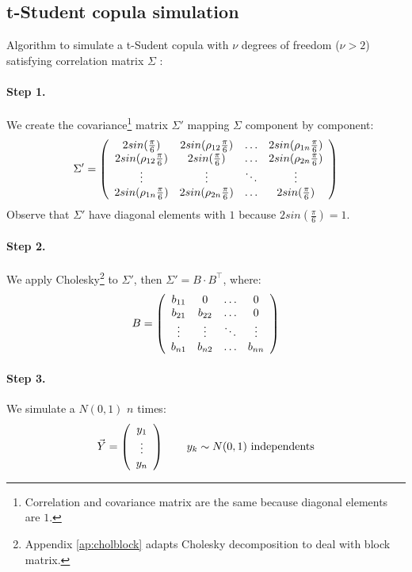 \documentclass[a4paper,12pt,final]{article}
\begin{document}
\subsection{t-Student copula simulation}
\label{ap:tstudentcopu}
Algorithm to simulate a t-Sudent copula with $\nu$ degrees of freedom ($\nu > 2$) 
satisfying correlation matrix $\Sigma$ \cite{copu:pricing}:

\paragraph{Step 1.} We create the covariance\footnote{Correlation and covariance 
matrix are the same because diagonal elements are $1$.} matrix $\Sigma'$ mapping 
$\Sigma$ component by component:
\begin{displaymath}
\Sigma' = \left( 
\begin{array}{cccc}
2 sin(\frac{\pi}{6})           & 2 sin(\rho_{12} \frac{\pi}{6}) & \ldots & 2 sin(\rho_{1n} \frac{\pi}{6})\cr
2 sin(\rho_{12} \frac{\pi}{6}) & 2 sin(\frac{\pi}{6})           & \ldots & 2 sin(\rho_{2n} \frac{\pi}{6})\cr
\vdots                         & \vdots                         & \ddots  & \vdots   \cr
2 sin(\rho_{1n} \frac{\pi}{6}) & 2 sin(\rho_{2n} \frac{\pi}{6}) & \ldots & 2 sin(\frac{\pi}{6})
\end{array}
\right)
\end{displaymath}
Observe that $\Sigma'$ have diagonal elements with $1$ because $2 sin(\frac{\pi}{6}) = 1$.

\paragraph{Step 2.} We apply Cholesky\footnote{Appendix \ref{ap:cholblock} adapts Cholesky 
decomposition to deal with block matrix.} to $\Sigma'$, then $\Sigma' = B \cdot B^{\top}$, 
where:
\begin{displaymath}
B = 
\left(
\begin{array}{cccc}
b_{11}   & 0        & \ldots & 0       \cr
b_{21}   & b_{22}   & \ldots & 0       \cr
\vdots  & \vdots  & \ddots & \vdots \cr
b_{n1}   & b_{n2}   & \ldots & b_{nn}
\end{array}
\right)
\end{displaymath}

\paragraph{Step 3.} We simulate a $N(0,1)$ $n$ times:
\begin{displaymath}
\vec{Y} =
\left(
\begin{array}{c}
y_1 \cr
\vdots \cr
y_n
\end{array}
\right) 
\qquad y_k \sim N(0,1) \textrm{ independents}
\end{displaymath}
\end{document}
